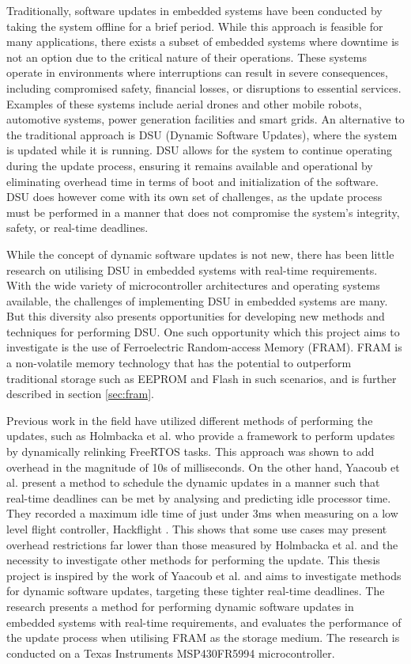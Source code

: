 Traditionally, software updates in embedded systems have been conducted by taking the system offline for a brief period. While this approach is feasible for many applications, there exists a subset of embedded systems where downtime is not an option due to the critical nature of their operations. These systems operate in environments where interruptions can result in severe consequences, including compromised safety, financial losses, or disruptions to essential services. Examples of these systems include aerial drones and other mobile robots, automotive systems, power generation facilities and smart grids. An alternative to the traditional approach is DSU (Dynamic Software Updates), where the system is updated while it is running. DSU allows for the system to continue operating during the update process, ensuring it remains available and operational by eliminating overhead time in terms of boot and initialization of the software. DSU does however come with its own set of challenges, as the update process must be performed in a manner that does not compromise the system's integrity, safety, or real-time deadlines.

While the concept of dynamic software updates is not new, there has been little research on utilising DSU in embedded systems with real-time requirements. With the wide variety of microcontroller architectures and operating systems available, the challenges of implementing DSU in embedded systems are many. But this diversity also presents opportunities for developing new methods and techniques for performing DSU. One such opportunity which this project aims to investigate is the use of Ferroelectric Random-access Memory (FRAM). FRAM is a non-volatile memory technology that has the potential to outperform traditional storage such as EEPROM and Flash in such scenarios, and is further described in section \ref{sec:fram}.

Previous work in the field have utilized different methods of performing the updates, such as Holmbacka et al. \cite{dynUpdateFramework} who provide a framework to perform updates by dynamically relinking FreeRTOS tasks. This approach was shown to add overhead in the magnitude of 10s of milliseconds. On the other hand, Yaacoub et al. \cite{NeRTA} present a method to schedule the dynamic updates in a manner such that real-time deadlines can be met by analysing and predicting idle processor time. They recorded a maximum idle time of just under 3ms when measuring on a low level flight controller, Hackflight \cite{hackflight}. This shows that some use cases may present overhead restrictions far lower than those measured by Holmbacka et al. and the necessity to investigate other methods for performing the update. This thesis project is inspired by the work of Yaacoub et al. and aims to investigate methods for dynamic software updates, targeting these tighter real-time deadlines. The research presents a method for performing dynamic software updates in embedded systems with real-time requirements, and evaluates the performance of the update process when utilising FRAM as the storage medium. The research is conducted on a Texas Instruments MSP430FR5994 microcontroller.

